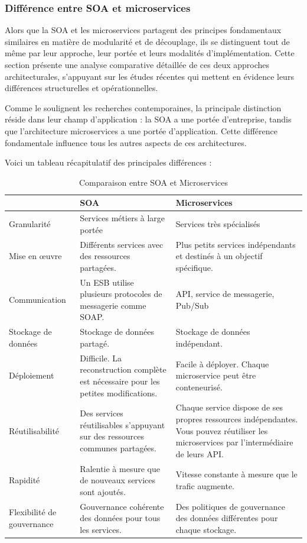 \subsubsection{Différence entre SOA et microservices}
Alors que la SOA et les microservices partagent des principes fondamentaux similaires en matière de modularité et de découplage, ils se distinguent tout de même par leur approche, leur portée et leurs modalités d'implémentation.
Cette section présente une analyse comparative détaillée de ces deux approches architecturales, s'appuyant sur les études récentes qui mettent en évidence leurs différences structurelles et opérationnelles.

Comme le soulignent les recherches contemporaines, la principale distinction réside dans leur champ d'application : la SOA a une portée d'entreprise, tandis que l'architecture microservices a une portée d'application. Cette différence fondamentale influence tous les autres aspects de ces architectures.

Voici un tableau récapitulatif des principales différences \cite{awada2018application,ibm2025soa}:
\begin{table}[h]
\centering
\caption{Comparaison entre SOA et Microservices}
\label{tab:soa-vs-microservices}
\begin{tabular}{|p{3.5cm}|p{5.5cm}|p{5.5cm}|}
\hline
\rowcolor{gray!30}
& \textbf{SOA} & \textbf{Microservices} \\
\hline
Granularité & Services métiers à large portée & Services très spécialisés \\
\hline
Mise en œuvre & Différents services avec des ressources partagées. & Plus petits services indépendants et destinés à un objectif spécifique. \\
\hline
Communication & Un ESB utilise plusieurs protocoles de messagerie comme SOAP. & API, service de messagerie, Pub/Sub \\
\hline
Stockage de données & Stockage de données partagé. & Stockage de données indépendant. \\
\hline
Déploiement & Difficile. La reconstruction complète est nécessaire pour les petites modifications. & Facile à déployer. Chaque microservice peut être conteneurisé. \\
\hline
Réutilisabilité & Des services réutilisables s'appuyant sur des ressources communes partagées. & Chaque service dispose de ses propres ressources indépendantes. Vous pouvez réutiliser les microservices par l'intermédiaire de leurs API. \\
\hline
Rapidité & Ralentie à mesure que de nouveaux services sont ajoutés. & Vitesse constante à mesure que le trafic augmente. \\
\hline
Flexibilité de gouvernance & Gouvernance cohérente des données pour tous les services. & Des politiques de gouvernance des données différentes pour chaque stockage. \\
\hline
\end{tabular}
\end{table}


